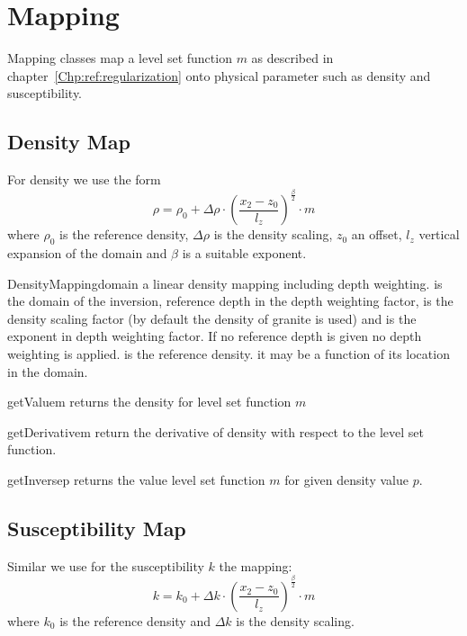 \chapter{Mapping}\label{Chp:ref:mapping}

Mapping classes map a level set function $m$ as described in chapter~\ref{Chp:ref:regularization}
onto physical parameter such as density and susceptibility. 

\section{Density Map}
For density we use the form 
\begin{equation}\label{EQU:MAP:1}
\rho =  \rho_{0} + \Delta \rho \cdot \left( \frac{x_2 - z_0}{l_z} \right)^{\frac{\beta}{2}}  \cdot m 
\end{equation}  
where $\rho_{0}$ is the reference density, $\Delta \rho$ is the density scaling, $z_0$ an offset, $l_z$ vertical expansion
of the domain and $\beta$ is a suitable exponent. 

\begin{classdesc}{DensityMapping}{domain }
a linear density mapping including depth weighting.  is the domain of the 
inversion,  reference depth in the depth weighting factor, 
 is the density scaling factor (by default the density of granite is used) and
 is the exponent in depth weighting factor. If no reference depth  is given
no depth weighting is applied.  is the reference density. it may be a function 
of its location in the domain. 
\end{classdesc}
\begin{methoddesc}[DensityMapping]{getValue}{m}
returns the density for level set function $m$
\end{methoddesc}

\begin{methoddesc}[DensityMapping]{getDerivative}{m}
return the derivative of density  with respect to the level set function.
\end{methoddesc}  

\begin{methoddesc}[DensityMapping]{getInverse}{p}
returns the value level set function $m$ for given density value $p$.
\end{methoddesc}


\section{Susceptibility Map}
Similar we use for the susceptibility $k$ the mapping:
\begin{equation}\label{EQU:MAP:2}
k=  k_{0} + \Delta k \cdot \left( \frac{x_2 - z_0}{l_z} \right)^{\frac{\beta}{2}}  \cdot m 
\end{equation}  
where $k_{0}$ is the reference density and $\Delta k$ is the density scaling.

